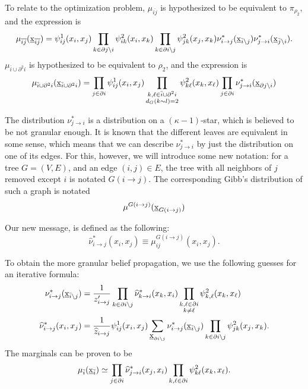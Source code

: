 \documentclass[12pt]{article}
\newcommand{\BS}{\backslash}
\newcommand{\wh}[1]{\widehat{#1}}
\newcommand{\UBX}{\underbar{\textbf{\normalfont x}}}
\newcommand{\BI}{{\bar{i}}}
\newcommand{\BJ}{{\bar{j}}}
\newcommand{\PI}{{\partial i}}
\newcommand{\PIN}{{\partial^2 i}}
\newcommand{\PJ}{{\partial j}}
\newcommand{\BIJ}{{\overline{ij}}}
\newcommand{\RA}{\rightarrow}
\numberwithin{equation}{section}
\begin{document}
To relate to the optimization problem, $\mu_{\BIJ}$ is hypothesized to be equivalent to $\pi_{\rho_2}$, and the expression is
\begin{equation}
    \mu_{\BIJ}(\UBX_{\BIJ}) = \psi^1_{ij}(x_i, x_j)\prod_{k\in\PJ\BS i} \psi^2_{ik}(x_i, x_k)\prod_{k\in\PI\BS j} \psi^2_{jk}(x_j, x_k) \nu^*_{i\RA j}(\UBX_{\BI\BS j})\nu^*_{j\RA i}(\UBX_{\BJ\BS i}).
\end{equation}
$\mu_{\BI\cup\PIN}$ is hypothesized to be equivalent to $\rho_2$, and the expression is
\begin{equation}
    \mu_{\BI\cup\PIN}(\UBX_{\BI\cup\PIN}) = \prod_{j\in\PI}\psi^1_{ij}(x_i, x_j)\prod_{\substack{k, \ell\in\BI\cup\PIN\\d_G(k\sim l)=2}}\psi^2_{k\ell}(x_k, x_\ell)\prod_{j\in \PI}\nu^*_{j\RA i}(\UBX_{\PJ\BS i})
\end{equation}

The distribution $\nu^*_{j\RA i}$ is a distribution on a $(\kappa-1)$-star, which is believed to be not granular enough. It is known that the different
leaves are equivalent in some sense, which means that we can describe $\nu^*_{j\RA i}$ by just the distribution on one of its edges. For this, however,
we will introduce some new notation: for a tree $G=(V, E)$, and an edge $(i, j)\in E$, the tree with all neighbors of $j$ removed except $i$ is
notated $G(i\RA j)$. The corresponding Gibb's distribution of such a graph is notated
\begin{equation*}
    \mu^{G(i\RA j)}(\UBX_{G(i\RA j)})
\end{equation*}

Our new message, is defined as the following:
\begin{equation}
    \wh{\nu}^*_{i\RA j}(x_i, x_j) \equiv \mu^{G(i\RA j)}_{ij}(x_i, x_j).
\end{equation}

To obtain the more granular belief propagation, we use the following guesses for an iterative formula:
\begin{align}
    \nu^*_{i\RA j}(\UBX_{\BI\BS j}) & = \frac{1}{z'_{i\RA j}}\prod_{k\in\PI\BS j}\wh{\nu}^*_{k\RA i}(x_k, x_i)\prod_{\substack{k,\ell\in\PI                                                                  \\k\neq\ell}}\psi^2_{k,\ell}(x_k, x_\ell) \label{Eq.NNNI-BP-HD1}\\
    \wh{\nu}^*_{i\RA j}(x_i, x_j)   & = \frac{1}{\wh{z}_{i\RA j}}\psi^1_{ij}(x_i, x_j)\sum_{\UBX_{\PI\BS j}}\nu^*_{i\RA j}(\UBX_{\BI\BS j})\prod_{k\in\PI\BS j}\psi^2_{jk}(x_j, x_k). \label{Eq.NNNI-BP-HD2}
\end{align}
The marginals can be proven to be
\begin{equation}
    \mu_{\BI}(\UBX_\BI)\simeq \prod_{j\in\PI}\wh{\nu}^*_{j\RA i}(x_j, x_i)\prod_{k,\ell\in\PI}\psi^2_{k\ell}(x_k, x_\ell).
\end{equation}
\end{document}
